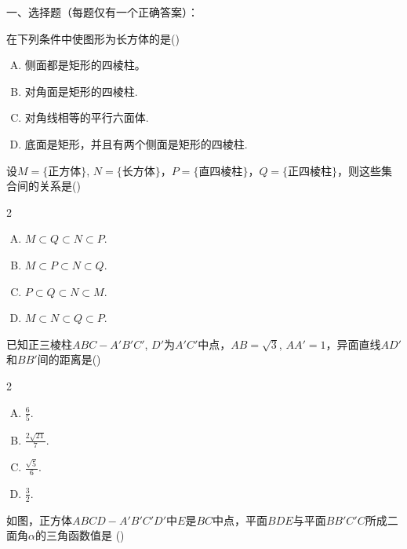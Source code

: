 一、选择题（每题仅有一个正确答案）：
\begin{enumerate}
    \item 在下列条件中使图形为长方体的是\hfill    (\qquad)
    \begin{enumerate}[(A)]
    \item 侧面都是矩形的四棱柱。
    \item 对角面是矩形的四棱柱.
    \item 对角线相等的平行六面体.
    \item 底面是矩形，并且有两个侧面是矩形的四棱柱.
    \end{enumerate}

    \item 设$M=\{\text{正方体}\}$, $N=\{\text{长方体}\}$，$P=\{\text{直四棱柱}\}$，$Q=\{\text{正四棱柱}\}$，则这些集合间的关系是\hfill    (\qquad)
\begin{multicols}{2}
    \begin{enumerate}[(A)]
\item $M\subset Q\subset N\subset P$.
\item $M\subset P\subset N\subset Q$.
\item $P\subset Q\subset N\subset M$.
\item $M\subset N\subset Q\subset P$.
\end{enumerate}
\end{multicols}


    \item 已知正三棱柱$ABC-A'B'C'$, $D'$为$A'C'$中点，$AB=\sqrt{3}$, $AA'=1$，异面直线$AD'$和$BB'$间的距离是\hfill    (\qquad)

    \noindent
    \begin{minipage}{.6\textwidth}
\begin{multicols}{2}
    \begin{enumerate}[(A)]
        \item $\frac{6}{5}$.
        \item $\frac{2\sqrt{21}}{7}$.
        \item $\frac{\sqrt{5}}{6}$.
        \item $\frac{3}{2}$.
        \end{enumerate}
\end{multicols}

\item 如图，正方体$ABCD-A'B'C'D'$中$E$是$BC$中点，平面$BDE$与平面$BB'C'C$所成二面角$\alpha$的三角函数值是
\hfill    (\qquad)
    \end{minipage}
    \hfill
    \begin{minipage}{.37\textwidth}
    \centering
\end{minipage}
\end{enumerate}
